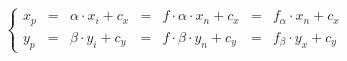 \begin{equation}
  \left\{
  \begin{array}{lllllll}
    x_p & = & \alpha \cdot x_i + c_x 
        & = & f \cdot \alpha \cdot x_n + c_x 
        & = & f_{\alpha} \cdot x_n + c_x \\
    y_p & = & \beta \cdot y_i + c_y 
        & = & f \cdot \beta \cdot y_n + c_y 
        & = & f_{\beta} \cdot y_x + c_y
  \end{array}
  \right.
\label{eq:idp4}
\end{equation}